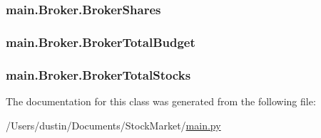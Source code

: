 \subsubsection[{Broker\+Shares}]{\setlength{\rightskip}{0pt plus 5cm}main.\+Broker.\+Broker\+Shares}\label{classmain_1_1_broker_a3bc95333d08957b412d05fec8c41384d}
\hypertarget{classmain_1_1_broker_a4466c604b69d2f0922abf2283564c8d1}{}
\subsubsection[{Broker\+Total\+Budget}]{\setlength{\rightskip}{0pt plus 5cm}main.\+Broker.\+Broker\+Total\+Budget}\label{classmain_1_1_broker_a4466c604b69d2f0922abf2283564c8d1}
\hypertarget{classmain_1_1_broker_afba91c0ecbf020fcfaee48ff04562005}{}
\subsubsection[{Broker\+Total\+Stocks}]{\setlength{\rightskip}{0pt plus 5cm}main.\+Broker.\+Broker\+Total\+Stocks}\label{classmain_1_1_broker_afba91c0ecbf020fcfaee48ff04562005}


The documentation for this class was generated from the following file\+:\begin{DoxyCompactItemize}
\item 
/\+Users/dustin/\+Documents/\+Stock\+Market/\hyperlink{main_8py}{main.\+py}\end{DoxyCompactItemize}

